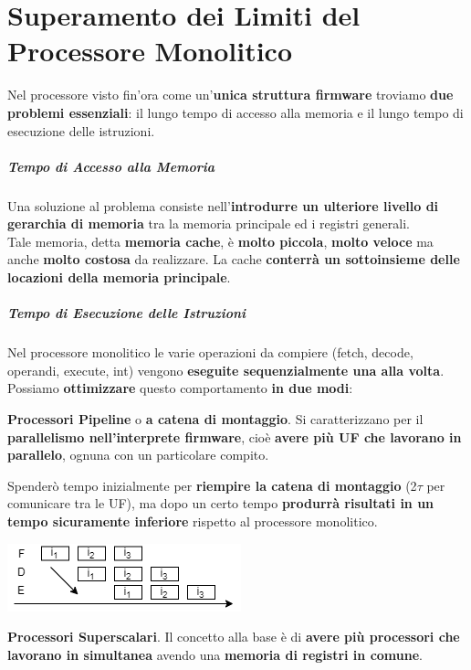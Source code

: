 \documentclass[10pt]{report}
\begin{document}
\chapter{Superamento dei Limiti del Processore Monolitico}
Nel processore visto fin'ora come un'\textbf{unica struttura firmware} troviamo \textbf{due problemi essenziali}: il lungo tempo di accesso alla memoria e il lungo tempo di esecuzione delle istruzioni.
\paragraph{Tempo di Accesso alla Memoria} Una soluzione al problema consiste nell'\textbf{introdurre un ulteriore livello di gerarchia di memoria} tra la memoria principale ed i registri generali.\\
Tale memoria, detta \textbf{memoria cache}, è \textbf{molto piccola}, \textbf{molto veloce} ma anche \textbf{molto costosa} da realizzare. La cache \textbf{conterrà un sottoinsieme delle locazioni della memoria principale}.
\paragraph{Tempo di Esecuzione delle Istruzioni} Nel processore monolitico le varie operazioni da compiere (fetch, decode, operandi, execute, int) vengono \textbf{eseguite sequenzialmente una alla volta}. Possiamo \textbf{ottimizzare} questo comportamento \textbf{in due modi}:
\begin{list}{}{}
	\item \textbf{Processori Pipeline} o \textbf{a catena di montaggio}. Si caratterizzano per il \textbf{parallelismo nell'interprete firmware}, cioè \textbf{avere più UF che lavorano in parallelo}, ognuna con un particolare compito.
	\begin{multicols}{2}
	Spenderò tempo inizialmente per \textbf{riempire la catena di montaggio} (2$\tau$ per comunicare tra le UF), ma dopo un certo tempo \textbf{produrrà risultati in un tempo sicuramente inferiore} rispetto al processore monolitico.
	\begin{center}
		\includegraphics[scale=1]{pipeline.png}
	\end{center}
	\end{multicols}
	\item \textbf{Processori Superscalari}. Il concetto alla base è di \textbf{avere più processori che lavorano in simultanea} avendo una \textbf{memoria di registri in comune}.
\end{list}
\end{document}
